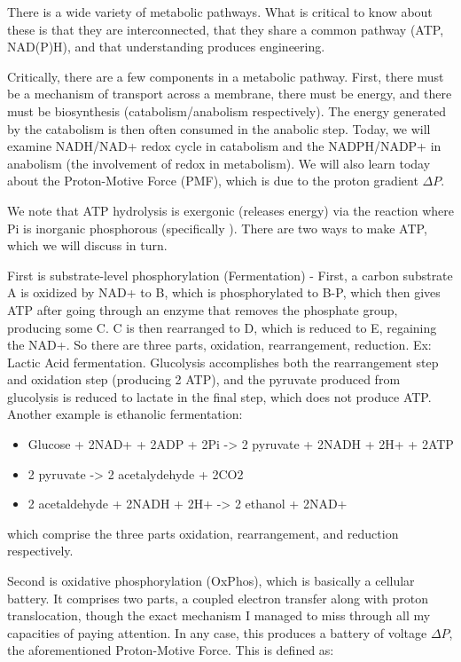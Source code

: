 \documentclass[12pt]{article}
\begin{document}
There is a wide variety of metabolic pathways. What is critical to know about these is that they are interconnected, that they share a common pathway (ATP, NAD(P)H), and that understanding produces engineering. 

Critically, there are a few components in a metabolic pathway. First, there must be a mechanism of transport across a membrane, there must be energy, and there must be biosynthesis (catabolism/anabolism respectively). The energy generated by the catabolism is then often consumed in the anabolic step. Today, we will examine NADH/NAD+ redox cycle in catabolism and the NADPH/NADP+ in anabolism (the involvement of redox in metabolism). We will also learn today about the Proton-Motive Force (PMF), which is due to the proton gradient $\Delta P$. 

We note that ATP hydrolysis is exergonic (releases energy) via the reaction  where Pi is inorganic phosphorous (specifically ). There are two ways to make ATP, which we will discuss in turn.

First is substrate-level phosphorylation (Fermentation) - First, a carbon substrate A is oxidized by NAD+ to B, which is phosphorylated to B-P, which then gives ATP after going through an enzyme that removes the phosphate group, producing some C. C is then rearranged to D, which is reduced to E, regaining the NAD+. So there are three parts, oxidation, rearrangement, reduction. Ex: Lactic Acid fermentation. Glucolysis accomplishes both the rearrangement step and oxidation step (producing 2 ATP), and the pyruvate produced from glucolysis is reduced to lactate in the final step, which does not produce ATP. Another example is ethanolic fermentation:
\begin{itemize}
	\item Glucose + 2NAD+ + 2ADP + 2Pi -> 2 pyruvate + 2NADH + 2H+ + 2ATP
	\item 2 pyruvate -> 2 acetalydehyde + 2CO2
	\item 2 acetaldehyde + 2NADH + 2H+ -> 2 ethanol + 2NAD+
\end{itemize}

which comprise the three parts oxidation, rearrangement, and reduction respectively.

Second is oxidative phosphorylation (OxPhos), which is basically a cellular battery. It comprises two parts, a coupled electron transfer along with proton translocation, though the exact mechanism I managed to miss through all my capacities of paying attention. In any case, this produces a battery of voltage $\Delta P$, the aforementioned Proton-Motive Force. This is defined as:
\end{document}
